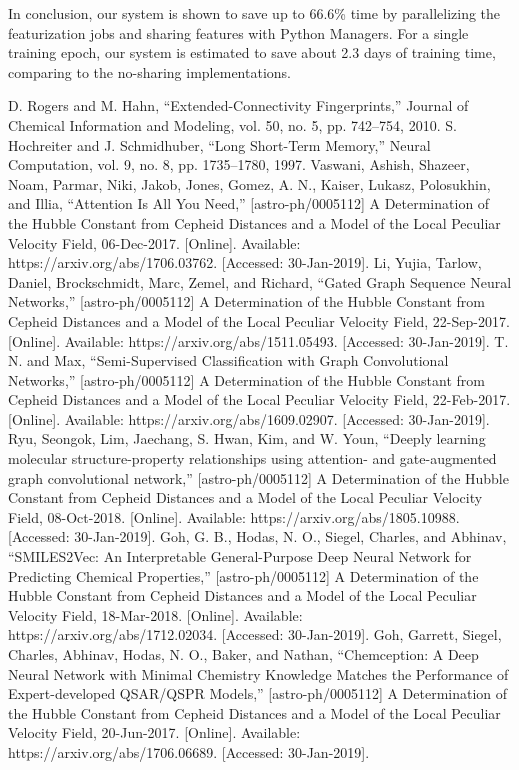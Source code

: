 \documentclass[conference]{IEEEtran}
\begin{document}
In conclusion, our system is shown to save up to 66.6\% time by parallelizing the featurization jobs and sharing features with Python Managers. 
For a single training epoch, our system is estimated to save about 2.3 days of training time, comparing to the no-sharing implementations.

\begin{thebibliography}{}
	 D. Rogers and M. Hahn, “Extended-Connectivity Fingerprints,” Journal of Chemical Information and Modeling, vol. 50, no. 5, pp. 742–754, 2010.
	 S. Hochreiter and J. Schmidhuber, “Long Short-Term Memory,” Neural Computation, vol. 9, no. 8, pp. 1735–1780, 1997.
	 Vaswani, Ashish, Shazeer, Noam, Parmar, Niki, Jakob, Jones, Gomez, A. N., Kaiser, Lukasz, Polosukhin, and Illia, “Attention Is All You Need,” [astro-ph/0005112] A Determination of the Hubble Constant from Cepheid Distances and a Model of the Local Peculiar Velocity Field, 06-Dec-2017. [Online]. Available: https://arxiv.org/abs/1706.03762. [Accessed: 30-Jan-2019].
	 Li, Yujia, Tarlow, Daniel, Brockschmidt, Marc, Zemel, and Richard, “Gated Graph Sequence Neural Networks,” [astro-ph/0005112] A Determination of the Hubble Constant from Cepheid Distances and a Model of the Local Peculiar Velocity Field, 22-Sep-2017. [Online]. Available: https://arxiv.org/abs/1511.05493. [Accessed: 30-Jan-2019].
	 T. N. and Max, “Semi-Supervised Classification with Graph Convolutional Networks,” [astro-ph/0005112] A Determination of the Hubble Constant from Cepheid Distances and a Model of the Local Peculiar Velocity Field, 22-Feb-2017. [Online]. Available: https://arxiv.org/abs/1609.02907. [Accessed: 30-Jan-2019].
	 Ryu, Seongok, Lim, Jaechang, S. Hwan, Kim, and W. Youn, “Deeply learning molecular structure-property relationships using attention- and gate-augmented graph convolutional network,” [astro-ph/0005112] A Determination of the Hubble Constant from Cepheid Distances and a Model of the Local Peculiar Velocity Field, 08-Oct-2018. [Online]. Available: https://arxiv.org/abs/1805.10988. [Accessed: 30-Jan-2019].
	 Goh, G. B., Hodas, N. O., Siegel, Charles, and Abhinav, “SMILES2Vec: An Interpretable General-Purpose Deep Neural Network for Predicting Chemical Properties,” [astro-ph/0005112] A Determination of the Hubble Constant from Cepheid Distances and a Model of the Local Peculiar Velocity Field, 18-Mar-2018. [Online]. Available: https://arxiv.org/abs/1712.02034. [Accessed: 30-Jan-2019].
	 Goh, Garrett, Siegel, Charles, Abhinav, Hodas, N. O., Baker, and Nathan, “Chemception: A Deep Neural Network with Minimal Chemistry Knowledge Matches the Performance of Expert-developed QSAR/QSPR Models,” [astro-ph/0005112] A Determination of the Hubble Constant from Cepheid Distances and a Model of the Local Peculiar Velocity Field, 20-Jun-2017. [Online]. Available: https://arxiv.org/abs/1706.06689. [Accessed: 30-Jan-2019].

\end{thebibliography}
\end{document}
